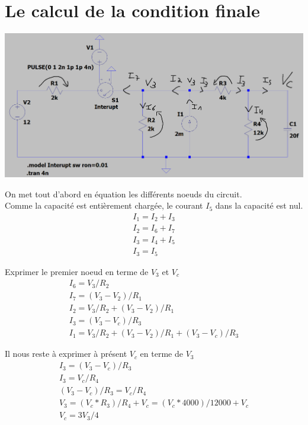 \documentclass{homeworg}
\begin{document}
\section{Le calcul de la condition finale}
    \begin{center}
        \includegraphics[scale=0.35]{Vfinal.png}
    \end{center}
    On met tout d'abord en équation les différents noeuds du circuit.\\
    Comme la capacité est entièrement chargée, le courant $I_5$ dans la capacité est nul.
    \begin{align}
        I_1 = I_2 + I_3\\
        I_2 = I_6 + I_7\\
        I_3 = I_4 + I_5\\
        I_3 = I_5
    \end{align}
    
    Exprimer le premier noeud en terme de $V_3$ et $V_c$
    \begin{align}
        I_6 = V_3 / R_2\\
        I_7 = (V_3 - V_2) / R_1\\
        I_2 = V_3 / R_2 + (V_3 - V_2) / R_1\\
        I_3 = (V_3 - V_c) / R_3\\
        I_1 = V_3 / R_2 + (V_3 - V_2) / R_1 + (V_3 - V_c) / R_3
    \end{align}
    
    Il nous reste à exprimer à présent $V_c$ en terme de $V_3$
    \begin{align}
        I_3 = (V_3 - V_c) / R_3\\
        I_3 = V_c / R_4\\
        (V_3 - V_c) / R_3 = V_c / R_4\\
        V_3 = (V_c * R_3) / R_4 + V_c = (V_c * 4000) / 12000 + V_c\\
        V_c = 3V_3 / 4
    \end{align}
    
\end{document}
